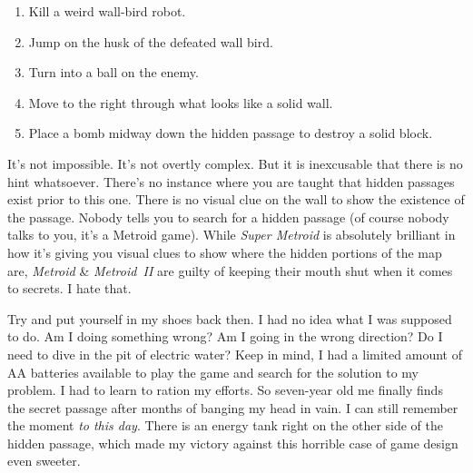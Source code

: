 \documentclass{book}
\let\oldcenter\center
\let\oldendcenter\endcenter
\renewenvironment{center}{\setlength\topsep{0pt}\oldcenter}{\oldendcenter}
\begin{document}
\begin{enumerate}
\item Kill a weird wall-bird robot.
\item Jump on the husk of the defeated wall bird.
\item Turn into a ball on the enemy.
\item Move to the right through what looks like a solid wall.
\item Place a bomb midway down the hidden passage to destroy a solid block.
\end{enumerate}\noindent

\begin{center}
\vspace{8pt}
\quad\vspace{4pt}
\quad\vspace{4pt}
\quad\vspace{4pt}
\quad\vspace{4pt}
\quad\vspace{4pt}
\end{center}

It’s not impossible. It’s not overtly complex. But it is inexcusable that there is no hint whatsoever. There’s no instance where you are taught that hidden passages exist prior to this one. There is no visual clue on the wall to show the existence of the passage. Nobody tells you to search for a hidden passage (of course nobody talks to you, it’s a Metroid game). While \emph{Super Metroid} is absolutely brilliant in how it’s giving you visual clues to show where the hidden portions of the map are, \emph{Metroid} \& \emph{Metroid II} are guilty of keeping their mouth shut when it comes to secrets. I hate that.

Try and put yourself in my shoes back then. I had no idea what I was supposed to do. Am I doing something wrong? Am I going in the wrong direction? Do I need to dive in the pit of electric water? Keep in mind, I had a limited amount of AA batteries available to play the game and search for the solution to my problem. I had to learn to ration my efforts. So seven-year old me finally finds the secret passage after months of banging my head in vain. I can still remember the moment \emph{to this day}. There is an energy tank right on the other side of the hidden passage, which made my victory against this horrible case of game design even sweeter.
\end{document}
